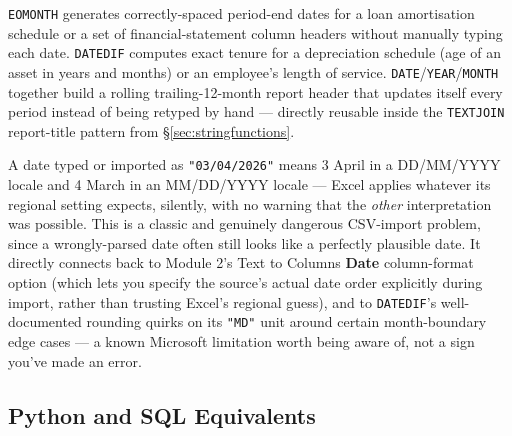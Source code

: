\documentclass[11pt,a4paper]{article}
\begin{document}
\begin{financeapp}
\texttt{EOMONTH} generates correctly-spaced period-end dates for a loan amortisation schedule or a set of financial-statement column headers without manually typing each date. \texttt{DATEDIF} computes exact tenure for a depreciation schedule (age of an asset in years and months) or an employee's length of service. \texttt{DATE}/\texttt{YEAR}/\texttt{MONTH} together build a rolling trailing-12-month report header that updates itself every period instead of being retyped by hand --- directly reusable inside the \texttt{TEXTJOIN} report-title pattern from \S\ref{sec:stringfunctions}.
\end{financeapp}

\begin{pitfall}
A date typed or imported as \texttt{"03/04/2026"} means 3 April in a DD/MM/YYYY locale and 4 March in an MM/DD/YYYY locale --- Excel applies whatever its regional setting expects, silently, with no warning that the \emph{other} interpretation was possible. This is a classic and genuinely dangerous CSV-import problem, since a wrongly-parsed date often still looks like a perfectly plausible date. It directly connects back to Module 2's Text to Columns \textbf{Date} column-format option (which lets you specify the source's actual date order explicitly during import, rather than trusting Excel's regional guess), and to \texttt{DATEDIF}'s well-documented rounding quirks on its \texttt{"MD"} unit around certain month-boundary edge cases --- a known Microsoft limitation worth being aware of, not a sign you've made an error.
\end{pitfall}

\subsection{Python and SQL Equivalents}
\end{document}
